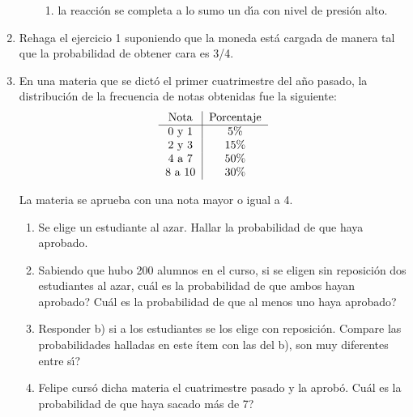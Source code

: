 \documentclass[11pt,a4paper,twoside]{article}%
\begin{document}
\begin{enumerate}
\begin{enumerate}
\begin{enumerate}
		\item  la reacci\'{o}n se completa a lo sumo un d\'{\i}a con nivel de presi\'{o}n alto.
	\end{enumerate}
	
\end{enumerate}


\item Rehaga el ejercicio 1 suponiendo que la moneda est\'{a} cargada de
manera tal que la probabilidad de obtener cara es 3/4. %

\item En una materia que se dict\'{o} el primer cuatrimestre del a\~{n}o
pasado, la distribuci\'{o}n de la frecuencia de notas obtenidas fue la
siguiente:\vspace{-0.1cm}%
\[%
\begin{tabular}
[c]{c|c}%
Nota & Porcentaje\\\hline
0 y 1 & 5\%\\
2 y 3 & 15\%\\
4 a 7 & 50\%\\
8 a 10 & 30\%
\end{tabular}
\]
\vspace{-0.2cm}

La materia se aprueba con una nota mayor o igual a 4.

\begin{enumerate}
\item \vspace{-0.1cm}Se elige un estudiante al azar. Hallar la probabilidad de
que haya aprobado.

\item Sabiendo que hubo 200 alumnos en el curso, si se eligen sin
reposici\'on dos estudiantes al azar, \textquestiondown cu\'{a}l es la probabilidad de que ambos
hayan aprobado? \textquestiondown Cu\'{a}l es la probabilidad de que al menos
uno haya aprobado?

\item Responder b) si a los estudiantes se los elige con reposici\'on. Compare las probabilidades halladas en este \'item con las del b), \textquestiondown son muy diferentes entre s\'{\i}?

\item Felipe curs\'{o} dicha materia el cuatrimestre pasado y la aprob\'{o}.
\textquestiondown Cu\'{a}l es la probabilidad de que haya sacado m\'{a}s de 7?


\end{enumerate}
\end{enumerate}
\end{document}
